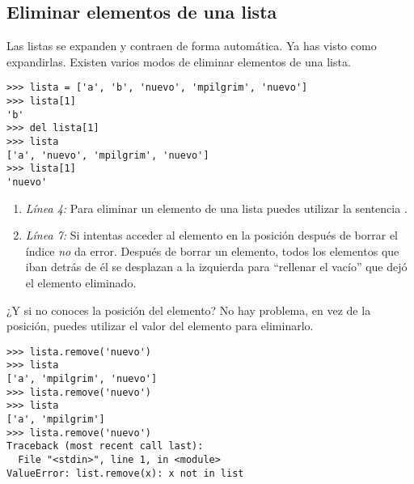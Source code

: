 \subsection{Eliminar elementos de una lista}


Las listas se expanden y contraen de forma automática. Ya has visto como expandirlas. Existen varios modos de eliminar elementos de una lista.

\noindent\begin{minipage}{\textwidth}
\begin{lstlisting}[mathescape=True]
>>> lista = ['a', 'b', 'nuevo', 'mpilgrim', 'nuevo']
>>> lista[1]
'b'
>>> del lista[1]
>>> lista
['a', 'nuevo', 'mpilgrim', 'nuevo']
>>> lista[1]
'nuevo'
\end{lstlisting}
\end{minipage}

\begin{enumerate}

\item \emph{Línea 4:} Para eliminar un elemento de una lista puedes utilizar la sentencia .

\item \emph{Línea 7:} Si intentas acceder al elemento en la posición  después de borrar el índice  \emph{no} da error. Después de borrar un elemento, todos los elementos que iban detrás de él se desplazan a la izquierda para ``rellenar el vacío'' que dejó el elemento eliminado.

\end{enumerate}

¿Y si no conoces la posición del elemento? No hay problema, en vez de la posición, puedes utilizar el valor del elemento para eliminarlo.

\noindent\begin{minipage}{\textwidth}
\begin{lstlisting}[mathescape=True]
>>> lista.remove('nuevo')
>>> lista
['a', 'mpilgrim', 'nuevo']
>>> lista.remove('nuevo')
>>> lista
['a', 'mpilgrim']
>>> lista.remove('nuevo')
Traceback (most recent call last):
  File "<stdin>", line 1, in <module>
ValueError: list.remove(x): x not in list
\end{lstlisting}
\end{minipage}

